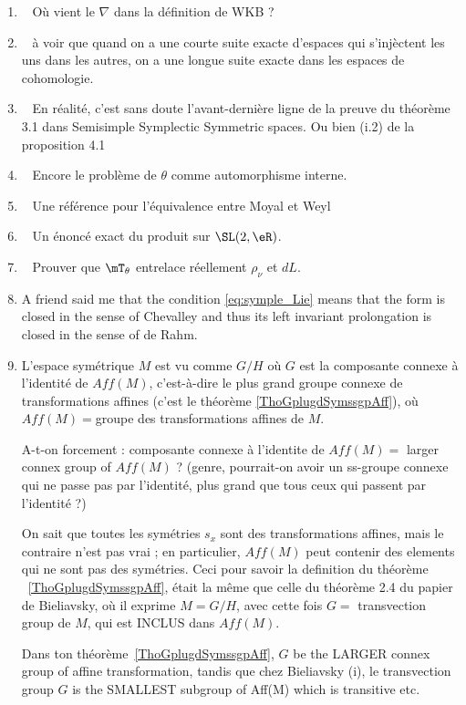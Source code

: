 \begin{enumerate}
	\item~ Où vient le $\nabla$ dans la définition de WKB ?
	\item~ à voir que quand on a une courte suite exacte d'espaces qui s'injèctent les uns dans les autres, on a une longue suite exacte dans les espaces de cohomologie.
	\item ~ En réalité, c'est sans doute l'avant-dernière ligne de la preuve du théorème 3.1 dans Semisimple Symplectic Symmetric spaces. Ou bien (i.2) de la proposition 4.1
	      \item~ Encore le problème de $\theta$ comme automorphisme interne.

	      \item~ Une référence pour l'équivalence entre Moyal et Weyl
	      \item~ Un énoncé exact du produit sur $\SL(2,\eR)$.
	      \item~ Prouver que $\mT_{\theta}$ entrelace réellement $\rho_{\nu}$ et $dL$.

	\item
	      A friend said me that the condition \eqref{eq:symple_Lie} means that the form is closed in the sense of Chevalley and thus its left invariant prolongation is closed in the sense of de Rahm.
	\item

	      L’espace symétrique $M$ est vu comme $G/H$ où $G$ est la composante connexe à l’identité de $Aff(M)$, c'est-à-dire  le plus grand groupe connexe de transformations affines (c'est le théorème \ref{ThoGplugdSymssgpAff}), où $Aff(M)=$groupe des transformations affines de $M$.

	      A-t-on forcement : composante connexe à l’identite de $Aff(M)  =$ larger connex group of $Aff(M)$ ?
	      (genre, pourrait-on avoir un ss-groupe connexe qui ne passe pas par l’identité, plus grand que tous ceux qui passent par l’identité ?)

	      On sait que toutes les symétries $s_x$ sont des transformations affines, mais le contraire n’est pas vrai ; en particulier, $Aff(M)$  peut contenir des elements qui ne sont pas des symétries.  Ceci pour savoir la definition du théorème ~\ref{ThoGplugdSymssgpAff}, était la même que celle du théorème 2.4 du papier de Bieliavsky, où il exprime $M=G/H$, avec cette fois $G =$ transvection group de $M$, qui est INCLUS dans $Aff(M)$.

	      Dans ton théorème~\ref{ThoGplugdSymssgpAff}, $G$ be the LARGER connex group of affine transformation, tandis que chez Bieliavsky (i), le transvection group $G$ is the SMALLEST subgroup of Aff(M) which is transitive etc.

\end{enumerate}


